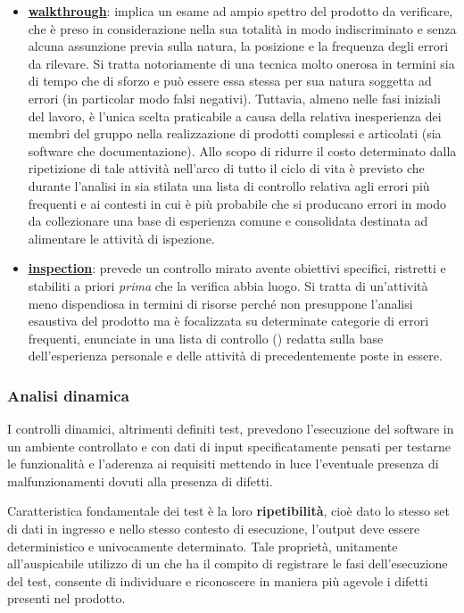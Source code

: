\begin{itemize}
\item \textbf{\underline{walkthrough}}: implica un esame ad ampio spettro del prodotto da verificare, che è preso in considerazione nella sua totalità in modo indiscriminato e senza alcuna assunzione previa sulla natura, la posizione e la frequenza degli errori da rilevare. Si tratta notoriamente di una tecnica molto onerosa in termini sia di tempo che di sforzo e può essere essa stessa per sua natura soggetta ad errori (in particolar modo falsi negativi). Tuttavia, almeno nelle fasi iniziali del lavoro, è l’unica scelta praticabile a causa della relativa inesperienza dei membri del gruppo nella realizzazione di prodotti complessi e articolati (sia software che documentazione). Allo scopo di ridurre il costo determinato dalla ripetizione di tale attività nell'arco di tutto il ciclo di vita è previsto che durante l’analisi in  sia stilata una lista di controllo relativa agli errori più frequenti e ai contesti in cui è più probabile che si producano errori in modo da collezionare una base di esperienza comune e consolidata destinata ad alimentare le attività di ispezione.

\item \textbf{\underline{inspection}}: prevede un controllo mirato avente obiettivi specifici, ristretti e stabiliti a priori \textit{prima} che la verifica abbia luogo. Si tratta di un’attività meno dispendiosa in termini di risorse perché non presuppone l’analisi esaustiva del prodotto ma è focalizzata su determinate categorie di errori frequenti, enunciate in una lista di controllo () redatta sulla base dell'esperienza personale e delle attività di  precedentemente poste in essere.
\end{itemize}


\subsubsection{Analisi dinamica} 
I controlli dinamici, altrimenti definiti test, prevedono l’esecuzione del software in un ambiente controllato e con dati di input specificatamente pensati per testarne le funzionalità e l’aderenza ai requisiti mettendo in luce l’eventuale presenza di malfunzionamenti dovuti alla presenza di difetti.

Caratteristica fondamentale dei test è la loro \textbf{ripetibilità}, cioè dato lo stesso set di dati in ingresso e nello stesso contesto di esecuzione, l’output deve essere deterministico e univocamente determinato. Tale proprietà, unitamente all'auspicabile utilizzo di un  che ha il compito di registrare le fasi dell'esecuzione del test, consente di individuare e riconoscere in maniera più agevole i difetti presenti nel prodotto.

